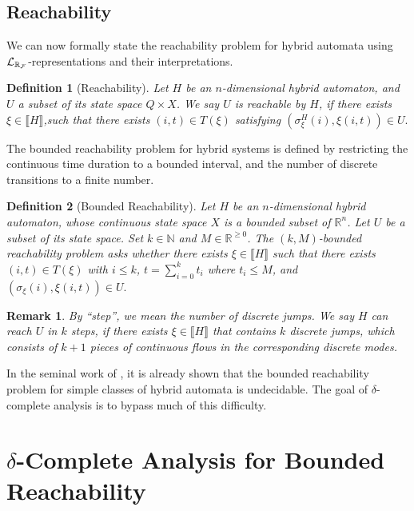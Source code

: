 \documentclass[journal]{IEEEtran}
\newtheorem{definition}{Definition}
\newtheorem{notation}{Notation}
\newtheorem{remark}{Remark}
\begin{document}
\subsection{Reachability}
We can now formally state the reachability problem for hybrid automata using $\mathcal{L}_{\mathbb{R}_{\mathcal{F}}}$-representations and their interpretations.
\begin{definition}[Reachability]\label{reachability}
Let $H$ be an $n$-dimensional hybrid automaton, and $U$ a subset of its state
space $Q\times X$.  We say {\em $U$ is reachable by $H$}, if there exists
$\xi\in\llbracket
H \rrbracket$,such that there exists $(i,t)\in T(\xi)$ satisfying
$(\sigma^H_{\xi}(i), \xi(i,t))\in U.$
\end{definition}
The bounded reachability problem for hybrid systems is defined by restricting
the continuous time duration to a bounded interval, and the number
of discrete transitions to a finite number.
\begin{definition}[Bounded Reachability]
Let $H$ be an $n$-dimensional hybrid automaton, whose continuous state space
$X$ is a bounded subset of $\mathbb{R}^n$. Let $U$ be a subset of its state
space. Set $k\in \mathbb{N}$ and $M \in \mathbb{R}^{\geq 0}$. The {$(k,M)$-bounded
reachability problem} asks whether there exists
$\xi\in\llbracket H \rrbracket$ such that there exists $(i,t)\in T(\xi)$ with $i\leq k$, $t=
\sum_{i=0}^k t_i$ where $t_i \leq M$, and $(\sigma_{\xi}(i), \xi(i,t))\in U.$
\end{definition}
\begin{remark}
By ``step'', we mean the number of discrete jumps. We say $H$ can reach $U$ in $k$ steps, if there exists $\xi\in\llbracket H\rrbracket$ that contains $k$ discrete jumps, which consists of $k+1$ pieces of continuous flows in the corresponding discrete modes.
\end{remark}

In the seminal work of \cite{DBLP:conf/rex/AlurD91,DBLP:conf/hybrid/AlurCHH92}, it is already shown that the bounded reachability problem for simple classes of hybrid automata is undecidable. The goal of $\delta$-complete analysis is to bypass much of this difficulty.

\section{$\delta$-Complete Analysis for Bounded Reachability}\label{main}
\end{document}
